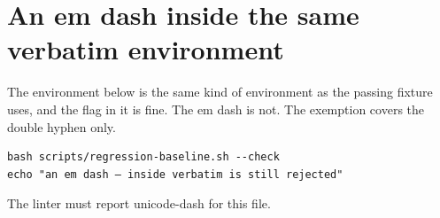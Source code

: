 \section{An em dash inside the same verbatim environment}

The environment below is the same kind of environment as the passing fixture
uses, and the flag in it is fine. The em dash is not. The exemption covers the
double hyphen only.

\begin{verbatim}
bash scripts/regression-baseline.sh --check
echo "an em dash — inside verbatim is still rejected"
\end{verbatim}

The linter must report unicode-dash for this file.
